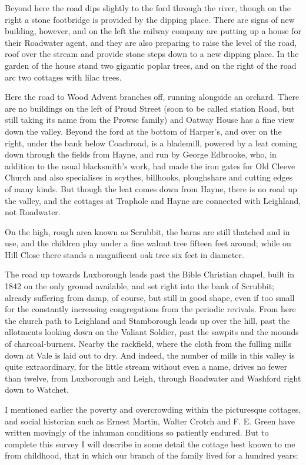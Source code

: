 Beyond here the road dips slightly to the ford through the river, though on the right a stone footbridge is provided by the dipping place. There are signs of new building, however, and on the left the railway company are putting up a house for their Roadwater agent, and they are also preparing to raise the level of the road, roof over the stream and provide stone steps down to a new dipping place. In the garden of the house stand two gigantic poplar trees, and on the right of the road arc two cottages with lilac trees.

Here the road to Wood Advent branches off, running alongside an orchard. There are no buildings on the left of Proud Street (soon to be called station Road, but still taking its name from the Prowsc family) and Oatway House has a fine view down the valley. Beyond the ford at the bottom of Harper's, and over on the right, under the bank below Coachroad, is a blademill, powered by a leat coming down through the fields from Hayne, and run by George Edbrooke, who, in addition to the usual blacksmith's work, had made the iron gates for Old Cleeve Church and also specialises in scythes, billhooks, ploughshare and cutting edges of many kinds. But though the leat comes down from Hayne, there is no road up the valley, and the cottages at Traphole and Hayne are connected with Leighland, not Roadwater.

On the high, rough area known as Scrubbit, the barns are still thatched and in use, and the children play under a fine walnut tree fifteen feet around; while on Hill Close there stands a magnificent oak tree six feet in diameter.

The road up towards Luxborough leads past the Bible Christian chapel, built in 1842 on the only ground available, and set right into the bank of Scrubbit; already suffering from damp, of course, but still in good shape, even if too small for the constantly increasing congregations from the periodic revivals. From here the church path to Leighland and Stamborough leads up over the hill, past the allotments looking down on the Valiant Soldier, past the sawpits and the mounds of charcoal-burners. Nearby the rackfield, where the cloth from the fulling mills down at Vale is laid out to dry. And indeed, the number of mills in this valley is quite extraordinary, for the little stream without even a name, drives no fewer than twelve, from Luxborough and Leigh, through Roadwater and Washford right down to Watchet.

I mentioned earlier the poverty and overcrowding within the picturesque cottages, and social historian such as Ernest Martin, Walter Crotch and F. E.  Green have written movingly of the inhuman conditions so patiently endured. But to complete this survey I will describe in some detail the cottage best known to me from childhood, that in which our branch of the family lived for a hundred years:

